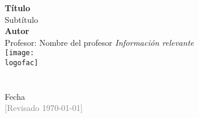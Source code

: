 
\begin{titlepage}
    \begin{center}
        \vspace*{0pt}   
        \Huge
        \textbf{Título}\\
        \vspace{1ex}
        \Large
        Subtítulo \\
        \vspace{5ex}
        \textbf{Autor}\\
        \vspace{.5ex}
        Profesor: Nombre del profesor
        \vfill
        \large\textit{Información relevante}\\
        \vspace{3ex}
        \texttt{[image: \\logofac]}\\
        \vspace{2ex}
        \large
        \textsc{\carrera}\\
        \textsc{\universidad}\\
        \vspace{.5ex}
        \normalsize Fecha\\
        \footnotesize \textcolor{gray}{[Revisado \today ]}
    \end{center}
\end{titlepage}